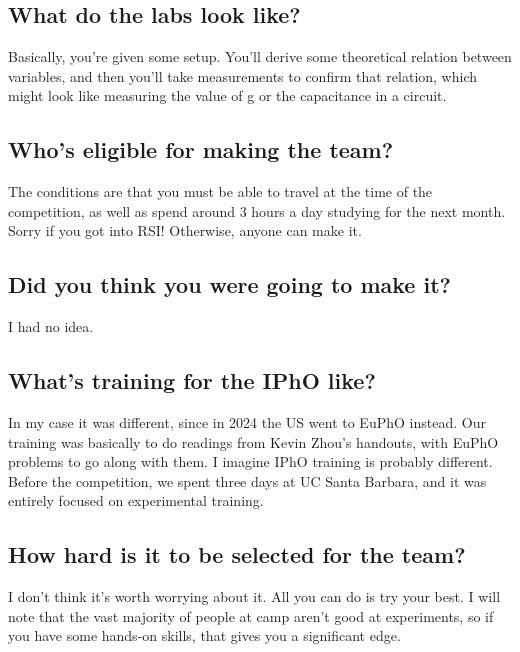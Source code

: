 \documentclass[11pt]{article}
\begin{document}
\subsection*{What do the labs look like?}
Basically, you’re given some setup. You’ll derive some theoretical relation between variables, and then you’ll take measurements to confirm that relation, which might look like measuring the value of g or the capacitance in a circuit.
\subsection*{Who’s eligible for making the team?}
The conditions are that you must be able to travel at the time of the competition, as well as spend around 3 hours a day studying for the next month. Sorry if you got into RSI! Otherwise, anyone can make it. 
\subsection*{Did you think you were going to make it?}
I had no idea.
\subsection*{What’s training for the IPhO like?}
In my case it was different, since in 2024 the US went to EuPhO instead. Our training was basically to do readings from Kevin Zhou's handouts, with EuPhO problems to go along with them. I imagine IPhO training is probably different. Before the competition, we spent three days at UC Santa Barbara, and it was entirely focused on experimental training.
\subsection*{How hard is it to be selected for the team?}
I don't think it's worth worrying about it. All you can do is try your best. I will note that the vast majority of people at camp aren't good at experiments, so if you have some hands-on skills, that gives you a significant edge.
\end{document}
